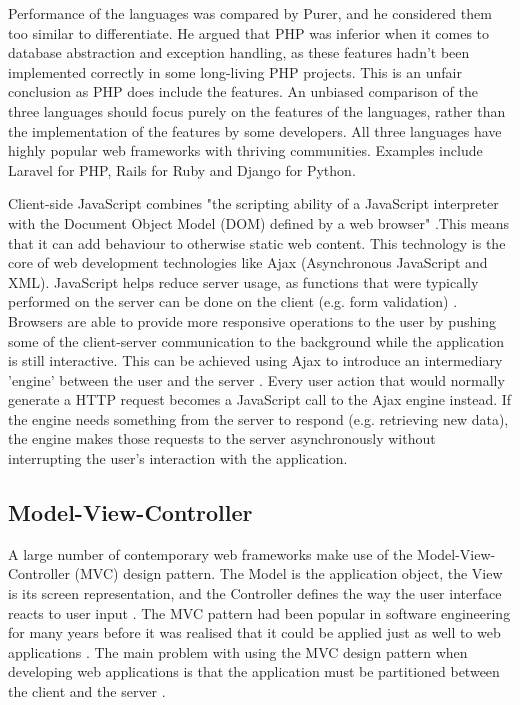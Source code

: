 \documentclass[authoryearcitations]{UoYCSproject}
\begin{document}
Performance of the languages was compared by Purer, and he considered them too similar to differentiate. He argued that PHP was inferior when it comes to database abstraction and exception handling, as these features hadn't been implemented correctly in some long-living PHP projects. This is an unfair conclusion as PHP does include the features. An unbiased comparison of the three languages should focus purely on the features of the languages, rather than the implementation of the features by some developers. All three languages have highly popular web frameworks with thriving communities. Examples include Laravel for PHP, Rails for Ruby and Django for Python.

Client-side JavaScript combines "the scripting ability of a JavaScript interpreter with the Document Object Model (DOM) defined by a web browser" \citep{Flanagan2006a}.This means that it can add behaviour to otherwise static web content. This technology is the core of web development technologies like Ajax (Asynchronous JavaScript and XML). JavaScript helps reduce server usage, as functions that were typically performed on the server can be done on the client (e.g. form validation) \citep{Jazayeri2007}. Browsers are able to provide more responsive operations to the user by pushing some of the client-server communication to the background while the application is still interactive. This can be achieved using Ajax to introduce an intermediary 'engine' between the user and the server \citep{Garrett2005}. Every user action that would normally generate a HTTP request becomes a JavaScript call to the Ajax engine instead. If the engine needs something from the server to respond (e.g. retrieving new data), the engine makes those requests to the server asynchronously without interrupting the user's interaction with the application. 


\subsection{Model-View-Controller}

A large number of contemporary web frameworks make use of the Model-View-Controller (MVC) design pattern. The Model is the application object, the View is its screen representation, and the Controller defines the way the user interface reacts to user input \citep{Gamma1995}. The MVC pattern had been popular in software engineering for many years before it was realised that it could be applied just as well to web applications \citep{Jazayeri2007}.  The main problem with using the MVC design pattern when developing web applications is that the application must be partitioned between the client and the server \citep{Leff2001}.
\end{document}
